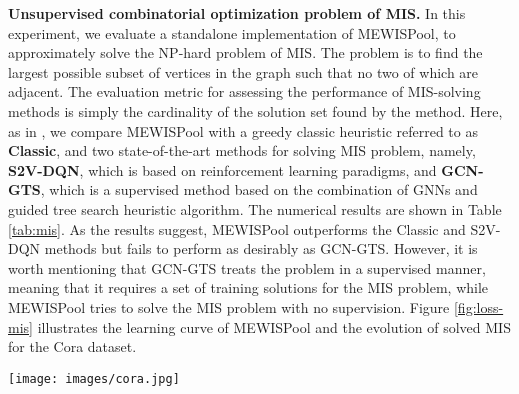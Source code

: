 \documentclass{article}
\begin{document}
\textbf{Unsupervised combinatorial optimization problem of MIS.} In this experiment, we evaluate a standalone implementation of MEWISPool, to approximately solve the NP-hard problem of MIS. The problem is to find the largest possible subset of vertices in the graph such that no two of which are adjacent. The evaluation metric for assessing the performance of MIS-solving methods is simply the cardinality of the solution set found by the method. Here, as in \cite{guidedtree}, we compare MEWISPool with a greedy classic heuristic referred to as \textbf{Classic}\cite{classic}, and two state-of-the-art methods for solving MIS problem, namely, \textbf{S2V-DQN}\cite{dqn}, which is based on reinforcement learning paradigms, and \textbf{GCN-GTS}\cite{guidedtree}, which is a supervised method based on the combination of GNNs and guided tree search heuristic algorithm. The numerical results are shown in Table \ref{tab:mis}. As the results suggest, MEWISPool outperforms the Classic and S2V-DQN methods but fails to perform as desirably as GCN-GTS. However, it is worth mentioning that GCN-GTS treats the problem in a supervised manner, meaning that it requires a set of training solutions for the MIS problem, while MEWISPool tries to solve the MIS problem with no supervision. Figure \ref{fig:loss-mis} illustrates the learning curve of MEWISPool and the evolution of solved MIS for the Cora dataset.
\begin{table}
	\begin{minipage}{0.40\linewidth}
		\caption{\scriptsize The comparison of MEWISPool's performance and other methods based on the size of the solution. MEWISPool consistently performs better than the classic greedy method and the reinforcement learning method of S2V-DQN \cite{classic, dqn}.}
		\label{tab:mis}
	\end{minipage}\hfill
	\begin{minipage}{0.55\linewidth}
		\centering
		\texttt{[image: images/cora.jpg]}
		\label{fig:loss-mis}
	\end{minipage}
\end{table}
\end{document}
